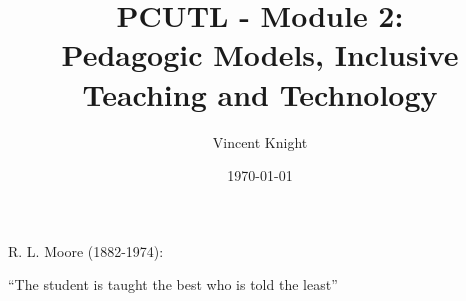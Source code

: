 \documentclass[a4paper,12pt]{article}
\title{PCUTL - Module 2:\\ Pedagogic Models, Inclusive Teaching and Technology}
\author{Vincent Knight}
\date{\today}
\begin{document}
\maketitle

%
%

R. L. Moore (1882-1974):
\begin{center}
    ``The student is taught the best who is told the least''
\end{center}
\end{document}
